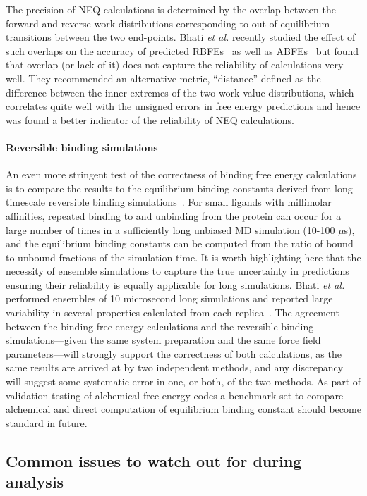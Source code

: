 \documentclass[9pt,bestpractices]{livecoms}
\begin{document}
 The precision of NEQ calculations is determined by the overlap between the forward and reverse work distributions corresponding to out-of-equilibrium transitions between the two end-points. Bhati \textit{et al.} recently studied the effect of such overlaps on the accuracy of predicted RBFEs~\cite{wan2023eqvsneq} as well as ABFEs~\cite{bhati2025} but found that overlap (or lack of it) does not capture the reliability of calculations very well. They recommended an alternative metric, ``distance'' defined as the difference between the inner extremes of the two work value distributions, which correlates quite well with the unsigned errors in free energy predictions and hence was found a better indicator of the reliability of NEQ calculations.

\paragraph{Reversible binding simulations}
An even more stringent test of the correctness of binding free energy calculations is to compare the results to the equilibrium binding constants derived from long timescale reversible binding simulations~\cite{pan2017quantitative}. For small ligands with millimolar affinities, repeated binding to and unbinding from the protein can occur for a large number of times in a sufficiently long unbiased MD simulation (10-100 $\mu$s), and the equilibrium binding constants can be computed from the ratio of bound to unbound fractions of the simulation time. 
It is worth highlighting here that the necessity of ensemble simulations to capture the true uncertainty in predictions ensuring their reliability is equally applicable for long simulations. Bhati \textit{et al.} performed ensembles of 10 microsecond long simulations and reported large variability in several properties calculated from each replica~\cite{bhati2023}.
The agreement between the binding free energy calculations and the reversible binding simulations---given the same system preparation and the same force field parameters---will strongly support the correctness of both calculations, as the same results are arrived at by two independent methods, and any discrepancy will suggest some systematic error in one, or both, of the two methods. As part of validation testing of alchemical free energy codes a benchmark set to compare alchemical and direct computation of equilibrium binding constant should become standard in future.

\subsection{Common issues to watch out for during analysis}
\end{document}
